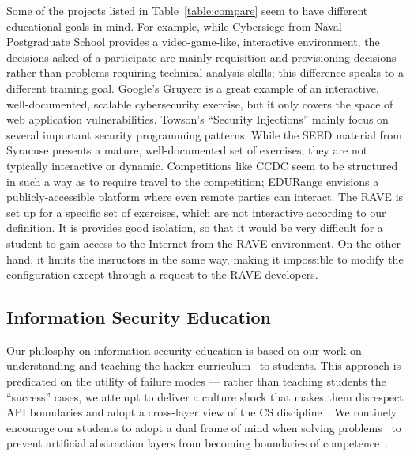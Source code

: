Some of the projects listed in Table~\ref{table:compare} seem to have
different educational goals in mind.  For example, while Cybersiege
from Naval Postgraduate School provides a video-game-like, interactive
environment, the decisions asked of a participate are mainly
requisition and provisioning decisions rather than problems requiring
technical analysis skills; this difference speaks to a different
training goal.  Google's Gruyere is a great example of an interactive,
well-documented, scalable cybersecurity exercise, but it only covers
the space of web application vulnerabilities.  Towson's ``Security
Injections'' mainly focus on several important security programming
patterns.  While the SEED material from Syracuse presents a mature,
well-documented set of exercises, they are not typically interactive
or dynamic.  Competitions like CCDC seem to be structured in such a
way as to require travel to the competition; EDURange envisions a
publicly-accessible platform where even remote parties can interact.
The RAVE is set up for a specific set of exercises, which are not interactive
according to our definition.  It is provides good isolation, so that it would be very difficult
for a student to gain access to the Internet from the RAVE environment.  On the other hand,
it limits the insructors in the same way, making it impossible to modify the configuration 
except through a request to the RAVE developers.

\subsection{Information Security Education}

Our philosphy on information security education is based on our work
on understanding and teaching the hacker
curriculum~\cite{bratus2007hacklearn} to students.  This approach is
predicated on the utility of failure modes --- rather than teaching
students the ``success'' cases, we attempt to deliver a culture shock
that makes them disrespect API boundaries and adopt a cross-layer view
of the CS discipline~\cite{bratus2010sigcse}.  We routinely encourage
our students to adopt a dual frame of mind when solving
problems~\cite{locasto2009own} to prevent artificial abstraction
layers from becoming boundaries of competence~\cite{white1996csedsec}.







